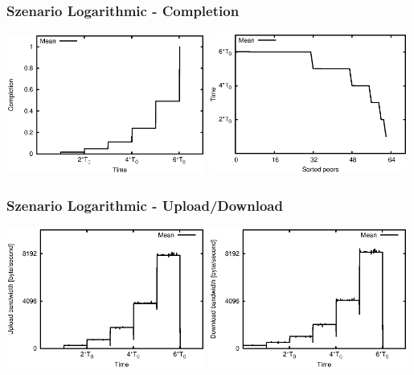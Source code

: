 \begin{frame}
  \frametitle{Szenario Logarithmic - Completion}
  \begin{center}
    \includegraphics[width=0.49\textwidth]{fig/plots/scenario_3_log/plots/GeneratedMeanChunkCompletion.csv.eps}
    \hfill
    \includegraphics[width=0.49\textwidth]{fig/plots/scenario_3_log/plots/GeneratedMeanSortedChunkCompletion.csv.eps}
  \end{center}
\end{frame}


\begin{frame}
  \frametitle{Szenario Logarithmic - Upload/Download}
  \begin{center}
    \includegraphics[width=0.49\textwidth]{fig/plots/scenario_3_log/plots/GeneratedMeanCurrentUploadBandwidth.csv.eps}
    \includegraphics[width=0.49\textwidth]{fig/plots/scenario_3_log/plots/GeneratedMeanCurrentDownloadBandwidth.csv.eps}
  \end{center}
\end{frame}



